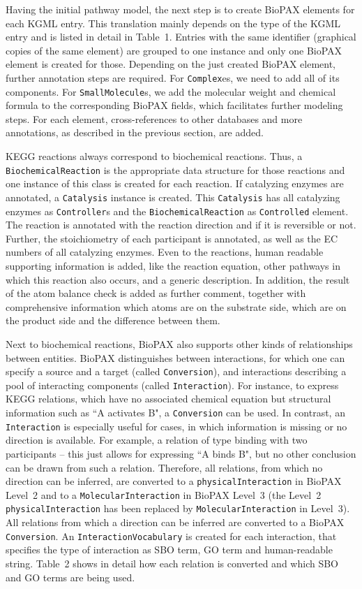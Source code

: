 \documentclass[10pt]{bmc_article}
\newenvironment{bmcformat}{\baselineskip20pt\sloppy\setboolean{publ}{false}}{\baselineskip20pt\sloppy}
\newcommand{\BiochemicalReaction}{\texttt{Bio\-chemical\-Reaction}}
\newcommand{\Catalysis}{\texttt{Cata\-lysis}}
\newcommand{\Conversion}{\texttt{Conversion}}
\newcommand{\Controllers}{\texttt{Controller}s}
\newcommand{\Controlled}{\texttt{Controlled}}
\newcommand{\Complexes}{\texttt{Complex}es}
\newcommand{\Interaction}{\texttt{Inter\-action}}
\newcommand{\InteractionVocabulary}{\texttt{Inter\-action\-Vo\-ca\-bu\-la\-ry}}
\newcommand{\MolecularInteraction}{\texttt{Mo\-le\-cu\-lar\-In\-ter\-ac\-tion}}
\newcommand{\physicalInteraction}{\texttt{physical\-Inter\-action}}
\newcommand{\SmallMolecules}{\texttt{Small\-Molecule}s}
\begin{document}
\begin{bmcformat}
Having the initial pathway model, the next step is to create BioPAX elements for each KGML entry. This translation mainly depends on the type of the KGML entry and is listed in detail in Table~1. Entries with the same identifier (graphical copies of the same element) are grouped to one instance and only one BioPAX element is created for those. Depending on the just created BioPAX element, further annotation steps are required. For \Complexes, we need to add all of its components. For \SmallMolecules, we add the molecular weight and chemical formula to the corresponding BioPAX fields, which facilitates further modeling steps. For each element, cross-references to other databases and more annotations, as described in the previous section, are added.

KEGG reactions always correspond to biochemical reactions. Thus, a \BiochemicalReaction{} is the appropriate data structure for those reactions and one instance of this class is created for each reaction. If catalyzing enzymes are annotated, a \Catalysis{} instance is created. This \Catalysis{} has all catalyzing enzymes as \Controllers{} and the \BiochemicalReaction{} as \Controlled{} element. The reaction is annotated with the reaction direction and if it is reversible or not. Further, the stoichiometry of each participant is annotated, as well as the EC numbers of all catalyzing enzymes. Even to the reactions, human readable supporting information is added, like the reaction equation, other pathways in which this reaction also occurs, and a generic description. In addition, the result of the atom balance check is added as further comment, together with comprehensive information which atoms are on the substrate side, which are on the product side and the difference between them.

Next to biochemical reactions, BioPAX also supports other kinds of relationships between entities.
BioPAX distinguishes between interactions, for which one can specify a source and a target (called \Conversion), and interactions describing a pool of interacting components (called \Interaction).
For instance, to express KEGG relations, which have no associated chemical equation but structural information such as ``A activates B", a \Conversion{} can be used.
In contrast, an \Interaction{} is especially useful for cases, in which information is missing or no direction is available.
%
For example, a relation of type binding with two participants -- this just allows for expressing ``A binds B", but no other conclusion can be drawn from such a relation. Therefore, all relations, from which no direction can be inferred, are converted to a \physicalInteraction{} in BioPAX Level~2 and to a \MolecularInteraction{} in BioPAX Level~3 (the Level~2 \physicalInteraction{} has been replaced by \MolecularInteraction{} in Level~3). All relations from which a direction can be inferred are converted to a BioPAX \Conversion{}.
An \InteractionVocabulary{} is created for each interaction, that specifies the type of interaction as SBO term, GO term and human-readable string. Table~2 shows in detail how each relation is converted and which SBO and GO terms are being used.




\end{bmcformat}
\end{document}
